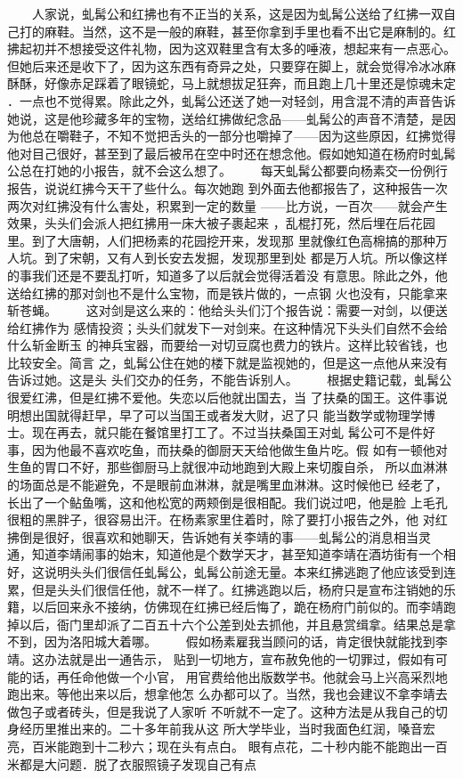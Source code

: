  　　人家说，虬髯公和红拂也有不正当的关系，这是因为虬髯公送给了红拂一双自 己打的麻鞋。当然，这不是一般的麻鞋，甚至你拿到手里也看不出它是麻制的。红 拂起初并不想接受这件礼物，因为这双鞋里含有太多的唾液，想起来有一点恶心。 但她后来还是收下了，因为这东西有奇异之处，只要穿在脚上，就会觉得冷冰冰麻 酥酥，好像赤足踩着了眼镜蛇，马上就想拔足狂奔，而且跑上几十里还是惊魂未定 ．一点也不觉得累。除此之外，虬髯公还送了她一对轻剑，用含混不清的声音告诉 她说，这是他珍藏多年的宝物，送给红拂做纪念品——虬髯公的声音不清楚，是因 为他总在嚼鞋子，不知不觉把舌头的一部分也嚼掉了——因为这些原因，红拂觉得 他对目己很好，甚至到了最后被吊在空中时还在想念他。假如她知道在杨府时虬髯 公总在打她的小报告，就不会这么想了。 　　每天虬髯公都要向杨素交一份例行报告，说说红拂今天干了些什么。每次她跑 到外面去他都报告了，这种报告一次两次对红拂没有什么害处，积累到一定的数量 ——比方说，一百次——就会产生效果，头头们会派人把红拂用一床大被子裹起来 ，乱棍打死，然后埋在后花园里。到了大唐朝，人们把杨素的花园挖开来，发现那 里就像红色高棉搞的那种万人坑。到了宋朝，又有人到长安去发掘，发现那里到处 都是万人坑。所以像这样的事我们还是不要乱打听，知道多了以后就会觉得活着没 有意思。除此之外，他送给红拂的那对剑也不是什么宝物，而是铁片做的，一点钢 火也没有，只能拿来斩苍蝇。 　　这对剑是这么来的：他给头头们汀个报告说：需要一对剑，以便送给红拂作为 感情投资；头头们就发下一对剑来。在这种情况下头头们自然不会给什么斩金断玉 的神兵宝器，而要给一对切豆腐也费力的铁片。这样比较省钱，也比较安全。简言 之，虬髯公住在她的楼下就是监视她的，但是这一点他从来没有告诉过她。这是头 头们交办的任务，不能告诉别人。 　　根据史籍记载，虬髯公很爱红沸，但是红拂不爱他。失恋以后他就出国去，当 了扶桑的国王。这件事说明想出国就得赶早，早了可以当国王或者发大财，迟了只 能当数学或物理学博士。现在再去，就只能在餐馆里打工了。不过当扶桑国王对虬 髯公可不是件好事，因为他最不喜欢吃鱼，而扶桑的御厨天天给他做生鱼片吃。假 如有一顿他对生鱼的胃口不好，那些御厨马上就很冲动地跑到大殿上来切腹自杀， 所以血淋淋的场面总是不能避免，不是眼前血淋淋，就是嘴里血淋淋。这时候他已 经老了，长出了一个鲇鱼嘴，这和他松宽的两颊倒是很相配。我们说过吧，他是脸 上毛孔很粗的黑胖子，很容易出汗。在杨素家里住着时，除了要打小报告之外，他 对红拂倒是很好，很喜欢和她聊天，告诉她有关李靖的事——虬髯公的消息相当灵 通，知道李靖闹事的始末，知道他是个数学天才，甚至知道李靖在酒坊街有一个相 好，这说明头头们很信任虬髯公，虬髯公前途无量。本来红拂逃跑了他应该受到连 累，但是头头们很信任他，就不一样了。红拂逃跑以后，杨府只是宣布注销她的乐 籍，以后回来永不接纳，仿佛现在红拂已经后悔了，跪在杨府门前似的。而李靖跑 掉以后，衙门里却派了二百五十六个公差到处去抓他，并且悬赏缉拿。结果总是拿 不到，因为洛阳城大着哪。 　　假如杨素雇我当顾问的话，肯定很快就能找到李靖。这办法就是出一通告示， 贴到一切地方，宣布赦免他的一切罪过，假如有可能的话，再任命他做一个小官， 用官费给他出版数学书。他就会马上兴高采烈地跑出来。等他出来以后，想拿他怎 么办都可以了。当然，我也会建议不拿李靖去做包子或者砖头，但是我说了人家听 不听就不一定了。这种方法是从我自己的切身经历里推出来的。二十多年前我从这 所大学毕业，当时我面色红润，嗓音宏亮，百米能跑到十二秒六；现在头有点白。 眼有点花，二十秒内能不能跑出一百米都是大问题．脱了衣服照镜子发现自己有点 